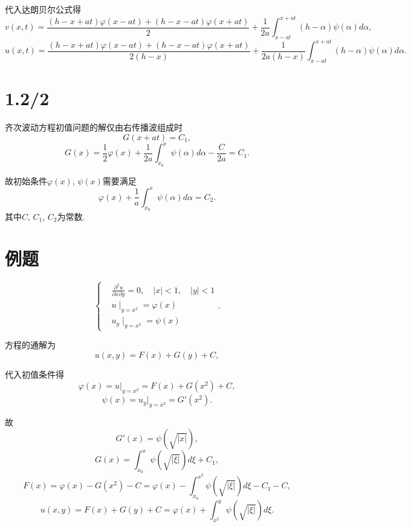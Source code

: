 \documentclass[11pt,a4paper]{article}
\begin{document}
代入达朗贝尔公式得
$$v(x,t)=\frac{(h-x+at)\varphi(x-at)+(h-x-at)\varphi(x+at)}{2}+\frac{1}{2a}\int_{x-at}^{x+at}(h-\alpha)\psi(\alpha)d\alpha,$$
$$u(x,t)=\frac{(h-x+at)\varphi(x-at)+(h-x-at)\varphi(x+at)}{2(h-x)}+\frac{1}{2a(h-x)}\int_{x-at}^{x+at}(h-\alpha)\psi(\alpha)d\alpha.$$

\section{1.2/2}

齐次波动方程初值问题的解仅由右传播波组成时
$$G(x+at)=C_1,$$
$$G(x)=\frac{1}{2}\varphi(x)+\frac{1}{2a}\int_{x_0}^x\psi(\alpha)d\alpha-\frac{C}{2a}=C_1.$$

故初始条件$\varphi(x)$, $\psi(x)$需要满足
$$\varphi(x)+\frac{1}{a}\int_{x_0}^x\psi(\alpha)d\alpha=C_2.$$
其中$C$, $C_1$, $C_2$为常数.

\section*{例题}

$$\left\{\begin{aligned}
     & \frac{\partial^2u}{\partial x\partial y}=0,\quad |x|<1,\quad |y|<1 \\
     & u\mid_{y=x^2}=\varphi(x)                                           \\
     & u_y\mid_{y=x^2}=\psi(x)
  \end{aligned}\right..$$

方程的通解为
$$u(x,y)=F(x)+G(y)+C,$$

代入初值条件得
$$\varphi(x)=u|_{y=x^2}=F(x)+G(x^2)+C,$$
$$\psi(x)=u_y|_{y=x^2}=G'(x^2).$$

故
$$G'(x)=\psi(\sqrt{|x|}),$$
$$G(x)=\int_{x_0}^x\psi(\sqrt{|\xi|})d\xi+C_1,$$
$$F(x)=\varphi(x)-G(x^2)-C=\varphi(x)-\int_{x_0}^{x^2}\psi(\sqrt{|\xi|})d\xi-C_1-C,$$
$$u(x,y)=F(x)+G(y)+C=\varphi(x)+\int_{x^2}^{y}\psi(\sqrt{|\xi|})d\xi.$$
\end{document}
